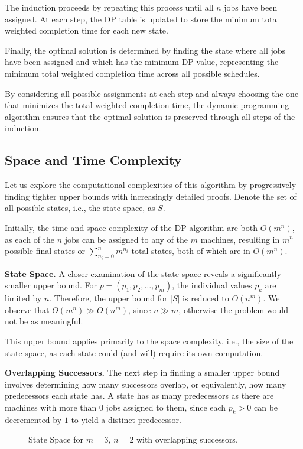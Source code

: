 The induction proceeds by repeating this process until all $n$ jobs have been assigned. At each step, the DP table is updated to store the minimum total weighted completion time for each new state.

Finally, the optimal solution is determined by finding the state where all jobs have been assigned and which has the minimum DP value, representing the minimum total weighted completion time across all possible schedules.

By considering all possible assignments at each step and always choosing the one that minimizes the total weighted completion time, the dynamic programming algorithm ensures that the optimal solution is preserved through all steps of the induction.

\subsection*{Space and Time Complexity}

Let us explore the computational complexities of this algorithm by progressively finding tighter upper bounds with increasingly detailed proofs. Denote the set of all possible states, i.e., the state space, as $S$.

Initially, the time and space complexity of the DP algorithm are both $O(m^n)$, as each of the $n$ jobs can be assigned to any of the $m$ machines, resulting in $m^n$ possible final states or $\sum_{n_i=0}^n m^{n_i}$ total states, both of which are in $O(m^n)$.

\textbf{State Space.} A closer examination of the state space reveals a significantly smaller upper bound. For $p = (p_1, p_2, \dots, p_m)$, the individual values $p_k$ are limited by $n$. Therefore, the upper bound for $|S|$ is reduced to $O(n^m)$. We observe that $O(m^n) \gg O(n^m)$, since $n \gg m$, otherwise the problem would not be as meaningful.

This upper bound applies primarily to the space complexity, i.e., the size of the state space, as each state could (and will) require its own computation.

\textbf{Overlapping Successors.} The next step in finding a smaller upper bound involves determining how many successors overlap, or equivalently, how many predecessors each state has. A state has as many predecessors as there are machines with more than $0$ jobs assigned to them, since each $p_k > 0$ can be decremented by $1$ to yield a distinct predecessor.

\begin{figure}[h!]
    \centering
    
    \caption{State Space for $m=3$, $n=2$ with overlapping successors.}
    \label{fig:full-ss-overlapping-successors}
\end{figure}

